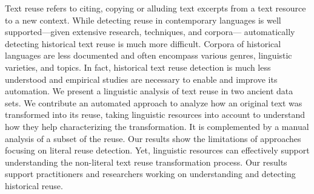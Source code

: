 Text reuse refers to citing, copying or alluding text excerpts from a text resource to a new context. While detecting reuse in contemporary languages is well supported—given extensive research, techniques, and corpora— automatically detecting historical text reuse is much more difficult. Corpora of historical languages are less documented and often encompass various genres, linguistic varieties, and topics. In fact, historical text reuse detection is much less understood and empirical studies are necessary to enable and improve its automation. We present a linguistic analysis of text reuse in two ancient data sets. We contribute an automated approach to analyze how an original text was transformed into its reuse, taking linguistic resources into account to understand how they help characterizing the transformation. It is complemented by a manual analysis of a subset of the reuse. Our results show the limitations of approaches focusing on literal reuse detection. Yet, linguistic resources can effectively support understanding the non-literal text reuse transformation process. Our results support practitioners and researchers working on understanding and detecting historical reuse.
